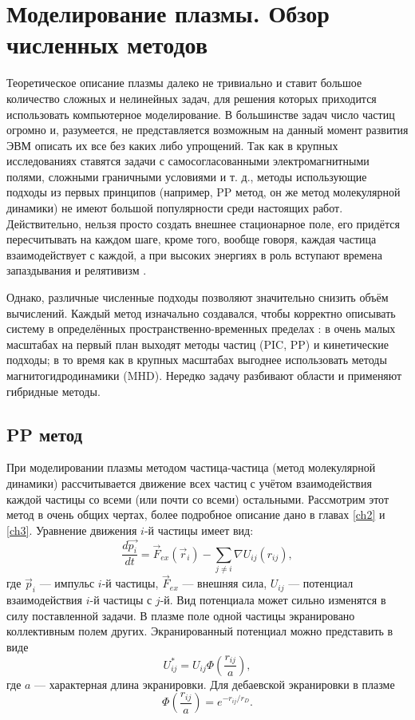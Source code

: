 
\section{Моделирование плазмы. Обзор численных методов}

Теоретическое описание плазмы далеко не тривиально и ставит большое количество сложных и нелинейных задач, для решения которых приходится использовать компьютерное моделирование. В большинстве задач число частиц огромно и, разумеется, не представляется возможным на данный момент развития ЭВМ описать их все без каких либо упрощений. Так как в крупных исследованиях ставятся задачи с самосогласованными электромагнитными полями, сложными граничными условиями и т. д., методы использующие подходы из первых принципов (например, PP метод, он же метод молекулярной динамики) не имеют большой популярности среди настоящих работ. Действительно, нельзя просто создать внешнее стационарное поле, его придётся пересчитывать на каждом шаге, кроме того, вообще говоря, каждая частица взаимодействует с каждой, а при высоких энергиях в роль вступают времена запаздывания и релятивизм \cite{Flower2007}.

Однако, различные численные подходы позволяют значительно снизить объём вычислений. Каждый метод изначально создавался, чтобы корректно описывать систему в определённых пространственно-временных пределах \cite{Miloch2014}: в очень малых масштабах на первый план выходят методы частиц (PIC, PP) и кинетические подходы; в то время как в крупных масштабах выгоднее использовать методы магнитогидродинамики (MHD). Нередко задачу разбивают области и применяют гибридные методы.


\subsection{PP метод}

При моделировании плазмы методом частица-частица (метод молекулярной динамики) рассчитывается движение всех частиц с учётом взаимодействия каждой частицы со всеми (или почти со всеми) остальными. Рассмотрим этот метод в очень общих чертах, более подробное описание дано в главах \ref{ch2} и \ref{ch3}. Уравнение движения $i$-й частицы имеет вид:
\begin{equation}
\frac{d \vec{p_i}}{dt} = \vec{F}_{ex} (\vec{r}_i) - \sum\limits_{j \neq i} \nabla U_{ij} (r_{ij}),
\end{equation}
где $\vec{p}_i$ --- импульс $i$-й частицы, $\vec{F}_{ex}$ --- внешняя сила, $U_{ij}$ --- потенциал взаимодействия $i$-й частицы с $j$-й. Вид потенциала может сильно изменятся в силу поставленной задачи. В плазме поле одной частицы экранировано коллективным полем других. Экранированный потенциал можно представить в виде
\begin{equation}
U^*_{ij} = U_{ij} \Phi \left(  \frac{r_{ij}}{a} \right),
\end{equation}
где $a$ --- характерная длина экранировки. Для дебаевской экранировки в плазме~\cite{Flower2007}
\begin{equation}
\Phi \left(  \frac{r_{ij}}{a} \right) = e^{- r_{ij}/r_D}.
\label{eq:debai1}
\end{equation}

